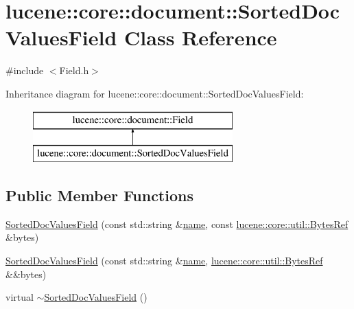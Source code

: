 \hypertarget{classlucene_1_1core_1_1document_1_1SortedDocValuesField}{}\section{lucene\+:\+:core\+:\+:document\+:\+:Sorted\+Doc\+Values\+Field Class Reference}
\label{classlucene_1_1core_1_1document_1_1SortedDocValuesField}


{\ttfamily \#include $<$Field.\+h$>$}

Inheritance diagram for lucene\+:\+:core\+:\+:document\+:\+:Sorted\+Doc\+Values\+Field\+:\begin{figure}[H]
\begin{center}
\leavevmode
\includegraphics[height=2.000000cm]{classlucene_1_1core_1_1document_1_1SortedDocValuesField}
\end{center}
\end{figure}
\subsection*{Public Member Functions}
\begin{DoxyCompactItemize}
\item 
\mbox{\hyperlink{classlucene_1_1core_1_1document_1_1SortedDocValuesField_ac719c5097e0d9280a600727b6832ed97}{Sorted\+Doc\+Values\+Field}} (const std\+::string \&\mbox{\hyperlink{classlucene_1_1core_1_1document_1_1Field_a52f673f3b3abb14b180f5159f4726537}{name}}, const \mbox{\hyperlink{classlucene_1_1core_1_1util_1_1BytesRef}{lucene\+::core\+::util\+::\+Bytes\+Ref}} \&bytes)
\item 
\mbox{\hyperlink{classlucene_1_1core_1_1document_1_1SortedDocValuesField_a8f1935bbacd77a69e967e28af37911c6}{Sorted\+Doc\+Values\+Field}} (const std\+::string \&\mbox{\hyperlink{classlucene_1_1core_1_1document_1_1Field_a52f673f3b3abb14b180f5159f4726537}{name}}, \mbox{\hyperlink{classlucene_1_1core_1_1util_1_1BytesRef}{lucene\+::core\+::util\+::\+Bytes\+Ref}} \&\&bytes)
\item 
virtual \mbox{\hyperlink{classlucene_1_1core_1_1document_1_1SortedDocValuesField_a6a8a5b87dbd1c802d8a920e005da0332}{$\sim$\+Sorted\+Doc\+Values\+Field}} ()
\end{DoxyCompactItemize}
